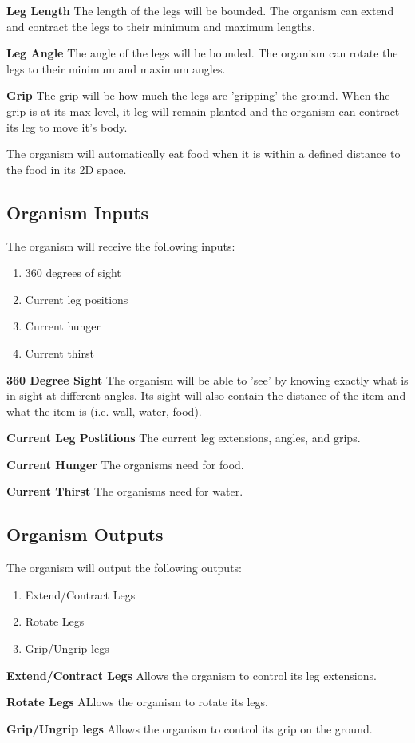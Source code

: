 \documentclass{article} %
\begin{document}
            \textbf{Leg Length}
                The length of the legs will be bounded. The organism can extend and contract the legs to their minimum and maximum lengths.

            \textbf{Leg Angle}
                The angle of the legs will be bounded. The organism can rotate the legs to their minimum and maximum angles.

            \textbf{Grip}
                The grip will be how much the legs are 'gripping' the ground. When the grip is at its max level, it leg will remain planted and the organism can contract its leg to move it's body.

            The organism will automatically eat food when it is within a defined distance to the food in its 2D space.
        
        \subsection{Organism Inputs}
            The organism will receive the following inputs:
            \begin{enumerate}[noitemsep]
                \item 360 degrees of sight
                \item Current leg positions
                \item Current hunger
                \item Current thirst
            \end{enumerate}

            \textbf{360 Degree Sight}
                The organism will be able to 'see' by knowing exactly what is in sight at different angles. Its sight will also contain the distance of the item and what the item is (i.e. wall, water, food).

            \textbf{Current Leg Postitions}
                The current leg extensions, angles, and grips.

            \textbf{Current Hunger}
                The organisms need for food.

            \textbf{Current Thirst}
                The organisms need for water.

        \subsection{Organism Outputs}
            The organism will output the following outputs:
            \begin{enumerate}[noitemsep]
                \item Extend/Contract Legs
                \item Rotate Legs
                \item Grip/Ungrip legs
            \end{enumerate}

            \textbf{Extend/Contract Legs}
                Allows the organism to control its leg extensions.

            \textbf{Rotate Legs}
                ALlows the organism to rotate its legs.
                
            \textbf{Grip/Ungrip legs}
                Allows the organism to control its grip on the ground.
\end{document}
